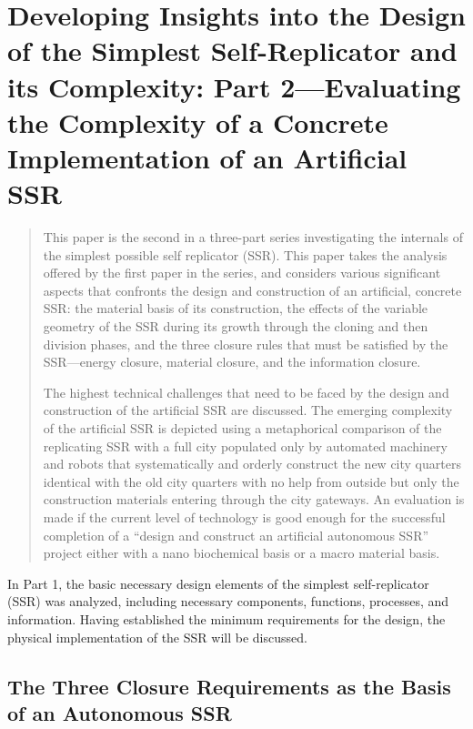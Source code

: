 \chapter[The Simplest Self-Replicator, Part 2]{Developing Insights into the Design of the Simplest Self-Replicator and its Complexity: Part 2---Evaluating the Complexity of a Concrete Implementation of an Artificial SSR}


\begin{abstract}
This paper is the second in a three-part series investigating the internals 
of the simplest possible self replicator (SSR).  
This paper takes the
analysis offered by the first paper in the series, and considers various 
significant aspects that confronts the
design and construction of an artificial, concrete SSR: the material
basis of its construction, the effects of the variable geometry of the
SSR during its growth through the cloning and then division phases, and the
three closure rules that must be satisfied by the SSR---energy closure,
material closure, and the information closure.

The highest technical
challenges that need to be faced by the design and construction of the
artificial SSR are discussed. The emerging complexity of the artificial
SSR is depicted using a metaphorical comparison of the replicating SSR
with a full city populated only by automated machinery and robots that
systematically and orderly construct the new city quarters identical
with the old city quarters with no help from outside but only the
construction materials entering through the city gateways. An
evaluation is made if the current level of technology is good enough
for the successful completion of a “design and construct an artificial
autonomous SSR” project either with a nano biochemical basis or a macro
material basis. 
\end{abstract}

In Part 1, the basic necessary design elements of the simplest self-replicator (SSR) 
was analyzed, including necessary components, functions, processes, and information.
Having established the minimum requirements for the design, the physical implementation
of the SSR will be discussed.

\section{The Three Closure Requirements as the Basis of an Autonomous SSR}

